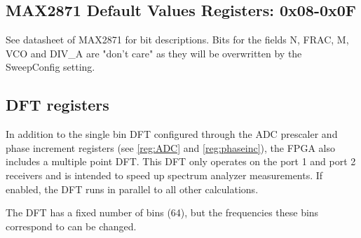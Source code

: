 \documentclass{article}
\newcommand{\bitrect}[2]{
  \begin{pgfonlayer}{foreground}
    \draw [thick] (0,0) rectangle (#1,1);
    \pgfmathsetmacro\result{#1-1}
    \foreach \x in {1,...,\result}
      \draw [thick] (\x,1) -- (\x, 0.8);
  \end{pgfonlayer}
  \bitlabels{#1}{#2}
}
\newcommand{\rwbits}[3]{
  \draw [thick] (#1,0) rectangle ++(#2,1) node[pos=0.5]{#3};
  \pgfmathsetmacro\start{#1+0.5}
  \pgfmathsetmacro\finish{#1+#2-0.5}
}
\newcommand{\bitlabels}[2]{
  \foreach \bit in {1,...,#1}{
     \pgfmathsetmacro\result{#2}
     \node [above] at (\bit-0.5, 1) {\pgfmathprintnumber{\result}};
   }
}
\begin{document}
\subsection{MAX2871 Default Values Registers: 0x08-0x0F}
See datasheet of MAX2871 for bit descriptions. Bits for the fields N, FRAC, M, VCO and DIV\_A are "don't care" as they will be overwritten by the SweepConfig setting.
\begin{center}
\end{center}

\subsection{DFT registers}
\label{dft}
In addition to the single bin DFT configured through the ADC prescaler and phase increment registers (see \ref{reg:ADC} and \ref{reg:phaseinc}), the FPGA also includes a multiple point DFT. This DFT only operates on the port 1 and port 2 receivers and is intended to speed up spectrum analyzer measurements. If enabled, the DFT runs in parallel to all other calculations.

The DFT has a fixed number of bins (64), but the frequencies these bins correspond to can be changed.
\end{document}
